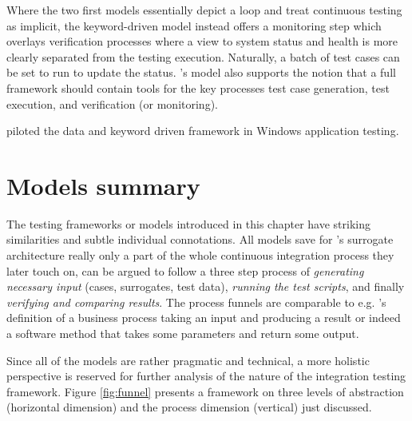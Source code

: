 \documentclass[12pt,a4paper,oneside,pdftex]{report}
\begin{document}
Where the two first models essentially depict a loop and treat continuous testing as implicit, the keyword-driven model instead offers a monitoring step which overlays verification processes where a view to system status and health is more clearly separated from the testing execution. Naturally, a batch of test cases can be set to run to update the status. \citeauthor{laukkanen2006data}'s \citeyearpar{laukkanen2006data} model also supports the notion that a full framework should contain tools for the key processes test case generation, test execution, and verification (or monitoring).

\citet{laukkanen2006data} piloted the data and keyword driven framework in Windows application testing.

\section{Models summary}

The testing frameworks or models introduced in this chapter have striking similarities and subtle individual connotations. All models save for \citeauthor{huang2008surrogate}'s \citeyearpar{huang2008surrogate} surrogate architecture really only a part of the whole continuous integration process they later touch on, can be argued to follow a three step process of \emph{generating necessary input} (cases, surrogates, test data), \emph{running the test scripts}, and finally \emph{verifying and comparing results}. The process funnels are comparable to e.g. \citeauthor{davenport1993process}'s \citeyearpar{davenport1993process} definition of a business process taking an input and producing a result or indeed a software method that takes some parameters and return some output.

Since all of the models are rather pragmatic and technical, a more holistic perspective is reserved for further analysis of the nature of the integration testing framework. Figure \ref{fig:funnel} presents a framework on three levels of abstraction (horizontal dimension) and the process dimension (vertical) just discussed.
\end{document}
